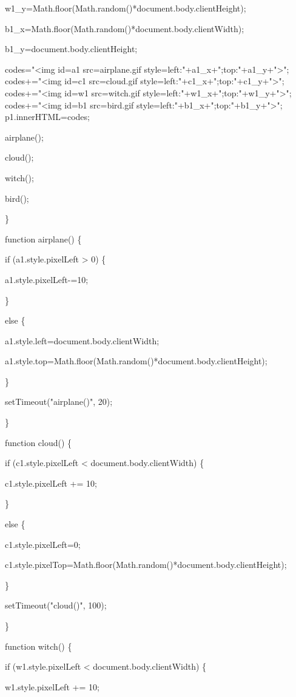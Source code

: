 \documentclass[
]{article}
\begin{document}
w1\_y=Math.floor(Math.random()*document.body.clientHeight);

b1\_x=Math.floor(Math.random()*document.body.clientWidth);

b1\_y=document.body.clientHeight;

codes="\textless img id=a1 src=airplane.gif
style=\textquotesingle left:"+a1\_x+";top:"+a1\_y+"\textquotesingle\textgreater";
codes+="\textless img id=c1 src=cloud.gif
style=\textquotesingle left:"+c1\_x+";top:"+c1\_y+"\textquotesingle\textgreater";
codes+="\textless img id=w1 src=witch.gif
style=\textquotesingle left:"+w1\_x+";top:"+w1\_y+"\textquotesingle\textgreater";
codes+="\textless img id=b1 src=bird.gif
style=\textquotesingle left:"+b1\_x+";top:"+b1\_y+"\textquotesingle\textgreater";
p1.innerHTML=codes;

airplane();

cloud();

witch();

bird();

\}

function airplane() \{

if (a1.style.pixelLeft \textgreater{} 0) \{

a1.style.pixelLeft-=10;

\}

else \{

a1.style.left=document.body.clientWidth;

a1.style.top=Math.floor(Math.random()*document.body.clientHeight);

\}

setTimeout("airplane()", 20);

\}

function cloud() \{

if (c1.style.pixelLeft \textless{} document.body.clientWidth) \{

c1.style.pixelLeft += 10;

\}

else \{

c1.style.pixelLeft=0;

c1.style.pixelTop=Math.floor(Math.random()*document.body.clientHeight);

\}

setTimeout("cloud()", 100);

\}

function witch() \{

if (w1.style.pixelLeft \textless{} document.body.clientWidth) \{

w1.style.pixelLeft += 10;
\end{document}
